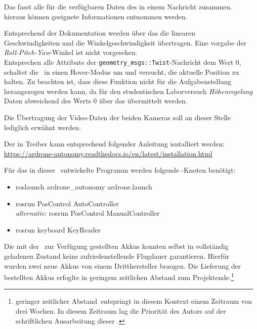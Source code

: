 Das  fasst alle für die verfügbaren Daten des \Quad[s] in einem Nachricht zusammen. hieraus können geeignete Informationen entnommen werden.


Entsprechend der Dokumentation werden über das  die linearen Geschwindigkeiten und die Winkelgeschwindigkeit übertragen. Eine vorgabe der \textit{Roll-Pitch-Yaw}-Winkel ist nicht vorgesehen. \\
Entsprechen alle Attribute der \texttt{geometry\_msgs::Twist}-Nachricht dem Wert 0, schaltet die \Ar\ in einen Hover-Modus um und versucht, die aktuelle Position zu halten. Zu beachten ist, dass diese Funktion nicht für die Aufgabenstellung herangezogen werden kann, da für den studentischen Laborversuch \textit{Höhenregelung} Daten abweichend des Werts 0 über das  übermittelt werden.


Die Übertragung der Video-Daten der beiden Kameras soll an dieser Stelle lediglich erwähnt werden.



Der in  Treiber kann entsprechend folgender Anleitung isntalliert werden:\\
\href{https://ardrone-autonomy.readthedocs.io/en/latest/installation.html}{https://ardrone-autonomy.readthedocs.io/en/latest/installation.html}

Für das in dieser \Arbeit\ entwickelte Programm werden folgende \ROS-Knoten benötigt:
\begin{itemize}
\item roslaunch ardrone\_autonomy ardrone.launch
\item rosrun PosControl AutoController\\
\textit{alternativ:} rosrun PosControl ManualController
\item rosrun keyboard KeyReader
\end{itemize}



Die mit der \Ar\ zur Verfügung gestellten Akkus konnten selbst in vollständig geladenen Zustand keine zufriedenstellende Flugdauer garantieren. Hierfür wurden zwei neue Akkus von einem Dritthersteller bezogen. Die Lieferung der bestellten Akkus erfoglte in geringem zeitlichen Abstand zum Projektende.\footnote{\glqq geringer zeitlicher Abstand\grqq\ entspringt in diesem Kontext einem Zeitraum von drei Wochen. In diesem Zeitraum lag die Priorität des Autors auf der schriftlichen Ausarbeitung dieser \Arbeit.}




















